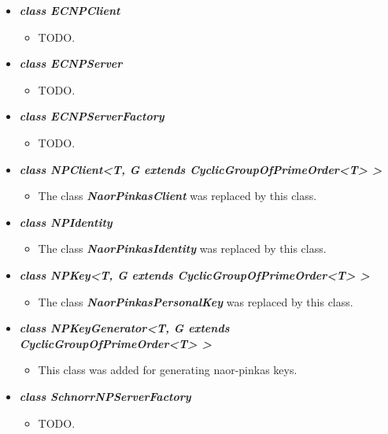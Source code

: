 \documentclass[a4paper,10pt]{scrartcl}
\begin{document}
\begin{itemize}
	
	
	\item \textit{\textbf{class ECNPClient}}
	\begin{itemize}
	 \item TODO.
	\end{itemize}
	
	\item \textit{\textbf{class ECNPServer}}
	\begin{itemize}
	 \item TODO.
	\end{itemize}
	
	\item \textit{\textbf{class ECNPServerFactory}}
	\begin{itemize}
	 \item TODO.
	\end{itemize}
	
	\item \textit{\textbf{class NPClient<T, G extends CyclicGroupOfPrimeOrder<T> > }}
	\begin{itemize}
	 \item The class \textit{\textbf{NaorPinkasClient}} was replaced by this class.
	\end{itemize}
	
	\item \textit{\textbf{class NPIdentity}}
	\begin{itemize}
	 \item The class \textit{\textbf{NaorPinkasIdentity}} was replaced by this class.
	\end{itemize}
	
	\item \textit{\textbf{class NPKey<T, G extends CyclicGroupOfPrimeOrder<T> >}}
	\begin{itemize}
	 \item The class \textit{\textbf{NaorPinkasPersonalKey}} was replaced by this class.
	\end{itemize}
	
	\item \textit{\textbf{class NPKeyGenerator<T, G extends CyclicGroupOfPrimeOrder<T> >}}
	\begin{itemize}
	 \item This class was added for generating naor-pinkas keys.
	\end{itemize}
	
	\item \textbf{\textit{class SchnorrNPServerFactory}}
	\begin{itemize}
	 \item TODO.
	\end{itemize}
	

\end{itemize}
\end{document}
